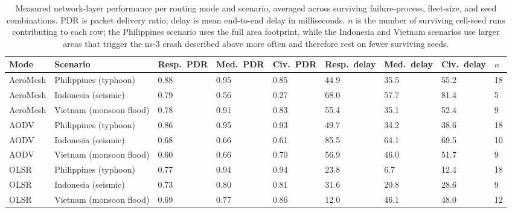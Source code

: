 \documentclass[drones,article,submit,moreauthors]{Definitions/mdpi}
\begin{document}
\begin{table}[H]
\caption{Measured network-layer performance per routing mode and scenario, averaged across surviving failure-process, fleet-size, and seed combinations. PDR is packet delivery ratio; delay is mean end-to-end delay in milliseconds. $n$ is the number of surviving cell-seed runs contributing to each row; the Philippines scenario uses the full area footprint, while the Indonesia and Vietnam scenarios use larger areas that trigger the ns-3 crash described above more often and therefore rest on fewer surviving seeds.}
\label{tab:netresults}
\begin{tabular}{p{1.6cm}p{2.6cm}p{1.0cm}p{1.0cm}p{1.0cm}p{1.1cm}p{1.1cm}p{1.1cm}p{0.5cm}}
\toprule
\textbf{Mode} & \textbf{Scenario} & \textbf{Resp.\ PDR} & \textbf{Med.\ PDR} & \textbf{Civ.\ PDR} & \textbf{Resp.\ delay} & \textbf{Med.\ delay} & \textbf{Civ.\ delay} & $n$ \\
\midrule
AeroMesh & Philippines (typhoon) & 0.88 & 0.95 & 0.85 & 44.9 & 35.5 & 55.2 & 18 \\
AeroMesh & Indonesia (seismic) & 0.79 & 0.56 & 0.27 & 68.0 & 57.7 & 81.4 & 5 \\
AeroMesh & Vietnam (monsoon flood) & 0.78 & 0.91 & 0.83 & 55.4 & 35.1 & 52.4 & 9 \\
AODV & Philippines (typhoon) & 0.86 & 0.95 & 0.93 & 49.7 & 34.2 & 38.6 & 18 \\
AODV & Indonesia (seismic) & 0.68 & 0.66 & 0.61 & 85.5 & 64.1 & 69.5 & 10 \\
AODV & Vietnam (monsoon flood) & 0.60 & 0.66 & 0.70 & 56.9 & 46.0 & 51.7 & 9 \\
OLSR & Philippines (typhoon) & 0.77 & 0.94 & 0.94 & 23.8 & 6.7 & 12.4 & 18 \\
OLSR & Indonesia (seismic) & 0.73 & 0.80 & 0.81 & 31.6 & 20.8 & 28.6 & 9 \\
OLSR & Vietnam (monsoon flood) & 0.69 & 0.77 & 0.86 & 12.0 & 46.1 & 48.0 & 12 \\
\bottomrule
\end{tabular}
\end{table}
\end{document}

